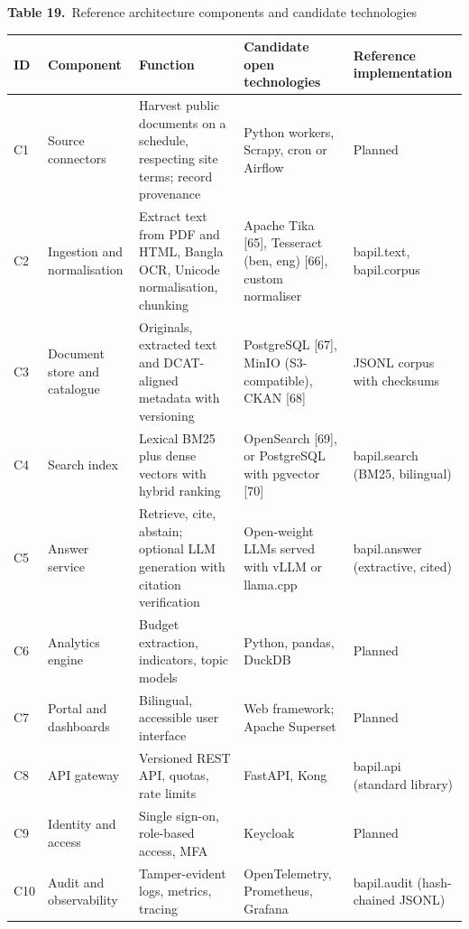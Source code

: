 \documentclass[border=10pt]{standalone}
\begin{document}
\begin{minipage}{17cm}
{\large\bfseries Table 19.}\ {\large Reference architecture components and candidate technologies}\par\vspace{7pt}
\small
{}
\begin{tabularx}{\linewidth}{@{}>{\hsize=0.309\hsize\raggedright\arraybackslash}X>{\hsize=0.979\hsize\raggedright\arraybackslash}X>{\hsize=1.546\hsize\raggedright\arraybackslash}X>{\hsize=1.340\hsize\raggedright\arraybackslash}X>{\hsize=0.825\hsize\raggedright\arraybackslash}X@{}}
\arrayrulecolor{bapilrule}\toprule
\rowcolor{white}\textbf{ID} & \textbf{Component} & \textbf{Function} & \textbf{Candidate open technologies} & \textbf{Reference implementation} \\
\midrule
C1 & Source connectors & Harvest public documents on a schedule, respecting site terms; record provenance & Python workers, Scrapy, cron or Airflow & Planned \\
C2 & Ingestion and normalisation & Extract text from PDF and HTML, Bangla OCR, Unicode normalisation, chunking & Apache Tika [65], Tesseract (ben, eng) [66], custom normaliser & bapil.text, bapil.corpus \\
C3 & Document store and catalogue & Originals, extracted text and DCAT-aligned metadata with versioning & PostgreSQL [67], MinIO (S3-compatible), CKAN [68] & JSONL corpus with checksums \\
C4 & Search index & Lexical BM25 plus dense vectors with hybrid ranking & OpenSearch [69], or PostgreSQL with pgvector [70] & bapil.search (BM25, bilingual) \\
C5 & Answer service & Retrieve, cite, abstain; optional LLM generation with citation verification & Open-weight LLMs served with vLLM or llama.cpp & bapil.answer (extractive, cited) \\
C6 & Analytics engine & Budget extraction, indicators, topic models & Python, pandas, DuckDB & Planned \\
C7 & Portal and dashboards & Bilingual, accessible user interface & Web framework; Apache Superset & Planned \\
C8 & API gateway & Versioned REST API, quotas, rate limits & FastAPI, Kong & bapil.api (standard library) \\
C9 & Identity and access & Single sign-on, role-based access, MFA & Keycloak & Planned \\
C10 & Audit and observability & Tamper-evident logs, metrics, tracing & OpenTelemetry, Prometheus, Grafana & bapil.audit (hash-chained JSONL) \\

\end{tabularx}
\end{minipage}
\end{document}
